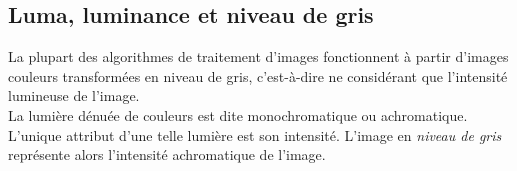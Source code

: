 \documentclass[a4paper,11pt]{report}
\begin{document}
%
\subsection{Luma, luminance et niveau de gris}
La plupart des algorithmes de traitement d'images fonctionnent à partir d'images couleurs transformées en niveau de gris, c'est-à-dire ne considérant que l'intensité lumineuse de l'image.\\
 
La lumière dénuée de couleurs est dite monochromatique ou achromatique. L'unique attribut d'une telle lumière est son intensité. L'image en \textit{niveau de gris} représente alors l'intensité achromatique de l'image.\\ 
\end{document}
